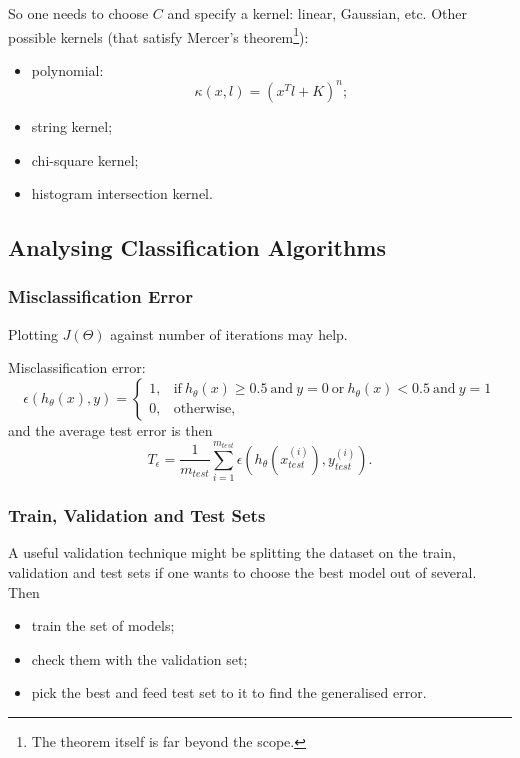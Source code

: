 \documentclass[a4paper,11pt]{article}
\begin{document}
So one needs to choose \textcolor{OliveGreen}{$C$} and specify a kernel: linear, Gaussian, etc. Other possible kernels (that satisfy Mercer's theorem\footnote{The theorem itself is far beyond the scope.}):
\begin{itemize}
\item polynomial:
\begin{equation}
\kappa \left(x, l \right) = \left(x^T l + K \right)^n ;
\end{equation}
\item string kernel;
\item chi-square kernel;
\item histogram intersection kernel.
\end{itemize}
\subsection{Analysing Classification Algorithms}
\subsubsection{Misclassification Error}
Plotting \textcolor{OliveGreen}{$J \left( \Theta \right)$} against number of iterations may help.

Misclassification error:
\begin{equation}
\epsilon \left( h_\theta (x) , y \right) = \begin{cases}
      1, & \text{if}\ h_\theta (x) \geq 0.5\ \text{and}\ y=0\ \text{or}\ h_\theta (x) < 0.5\ \text{and}\ y=1 \\
      0, & \text{otherwise} ,
    \end{cases}
\end{equation}
and the average test error is then
\begin{equation}
T_\epsilon = \frac{1}{m_{test}} \sum_{i=1} ^{m_{test}} \epsilon \left( h_\theta \left(x_{test} ^{(i)}\right) , y_{test} ^{(i)} \right) .
\end{equation}

\subsubsection{Train, Validation and Test Sets}
A useful validation technique might be splitting the dataset on the train, validation and test sets if one wants to choose the best model out of several. Then
\begin{itemize}
\item train the set of models;
\item check them with the validation set;
\item pick the best and feed test set to it to find the generalised error.
\end{itemize}
\end{document}
